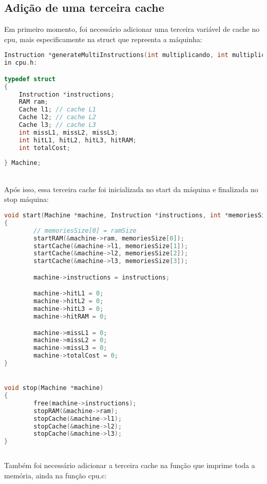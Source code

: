 \documentclass{article}
\begin{document}
\subsection{Adição de uma terceira cache}
Em primeiro momento, foi necessário adicionar uma terceira variável de cache no cpu, mais especificamente na struct que repreenta a máquinha:
\begin{lstlisting}[caption={Exemplo de código para a struct máquina.},label={lst:cod1},language=C]
Instruction *generateMultiInstructions(int multiplicando, int multiplicador)
in cpu.h:

typedef struct
{
    Instruction *instructions;
    RAM ram;
    Cache l1; // cache L1
    Cache l2; // cache L2
    Cache l3; // cache L3
    int missL1, missL2, missL3;
    int hitL1, hitL2, hitL3, hitRAM;
    int totalCost;
    
} Machine;

\end{lstlisting}
\\
Após isso, essa terceira cache foi inicializada no start da máquina e finalizada no stop máquina:
\begin{lstlisting}[caption={Exemplo de código para as funções start e stop.},label={lst:cod1},language=C]
void start(Machine *machine, Instruction *instructions, int *memoriesSize)
{
        // memoriesSize[0] = ramSize
        startRAM(&machine->ram, memoriesSize[0]);
        startCache(&machine->l1, memoriesSize[1]);
        startCache(&machine->l2, memoriesSize[2]);
        startCache(&machine->l3, memoriesSize[3]);

        machine->instructions = instructions;

        machine->hitL1 = 0;
        machine->hitL2 = 0;
        machine->hitL3 = 0;
        machine->hitRAM = 0;

        machine->missL1 = 0;
        machine->missL2 = 0;
        machine->missL3 = 0;
        machine->totalCost = 0;
}


void stop(Machine *machine)
{
        free(machine->instructions);
        stopRAM(&machine->ram);
        stopCache(&machine->l1);
        stopCache(&machine->l2);
        stopCache(&machine->l3);
}
 

\end{lstlisting}
Também foi necessário adicionar a terceira cache na função que imprime toda a memória, ainda na função cpu.c:
\end{document}
